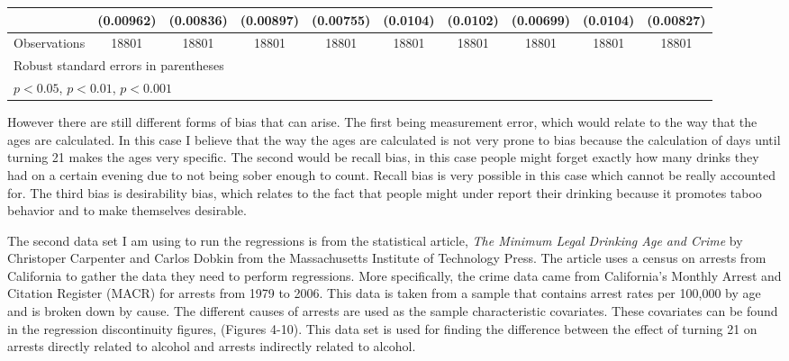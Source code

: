 \documentclass[a4paper]{article}
\begin{document}
\begin{table}[h!]
{\begin{tabular}{l*{9}{c}}
                    &   (0.00962)         &   (0.00836)         &   (0.00897)         &   (0.00755)         &    (0.0104)         &    (0.0102)         &   (0.00699)         &    (0.0104)         &   (0.00827)         \\
\hline
Observations        &       18801         &       18801         &       18801         &       18801         &       18801         &       18801         &       18801         &       18801         &       18801         \\
\hline\hline
\multicolumn{10}{l}{\footnotesize Robust standard errors in parentheses}\\
\multicolumn{10}{l}{\footnotesize \sym{*} \(p<0.05\), \sym{**} \(p<0.01\), \sym{***} \(p<0.001\)}\\
    \end{tabular}}

\label{tab:my_label}
\end{table}

\par
However there are still different forms of bias that can arise. The first being measurement error, which would relate to the way that the ages are calculated. In this case I believe that the way the ages are calculated is not very prone to bias because the calculation of days until turning 21 makes the ages very specific. The second would be recall bias, in this case people might forget exactly how many drinks they had on a certain evening due to not being sober enough to count. Recall bias is very possible in this case which cannot be really accounted for. The third bias is desirability bias, which relates to the fact that people might under report their drinking because it promotes taboo behavior and to make themselves desirable. 
\par
The second data set I am using to run the regressions is from the statistical article,  \textit{The Minimum Legal Drinking Age and Crime} by Christoper Carpenter and Carlos Dobkin from the Massachusetts Institute of Technology Press. The article uses a census on arrests from California to gather the data they need to perform regressions. More specifically, the crime data came from California's Monthly Arrest and Citation Register (MACR) for arrests from 1979 to 2006. This data is taken from a sample that contains arrest rates per 100,000 by age and is broken down by cause. The different causes of arrests are used as the sample characteristic covariates. These covariates can be found in the regression discontinuity figures, (Figures 4-10). This data set is used for finding the difference between the effect of turning 21 on arrests directly related to alcohol and arrests indirectly related to alcohol. 
\end{document}
